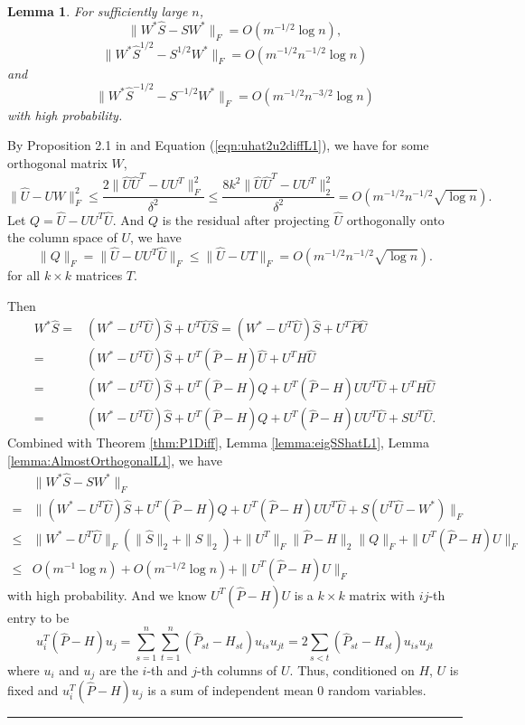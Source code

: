 \documentclass[a4paper]{article}
\newenvironment{proof}{{\bf Proof:  }}{\hfill\rule{2mm}{2mm}}
\newtheorem{lemma}[fact]{Lemma}
\begin{document}
\begin{lemma}
\label{lemma:exchangeL1}
For sufficiently large $n$,
\[
	\| W^* \hat{S} - S W^* \|_F = O(m^{-1/2} \log n),
\]
\[
	\|W^* \hat{S}^{1/2} - S^{1/2} W^* \|_F = O(m^{-1/2} n^{-1/2} \log n)
\]
and
\[
	\| W^* \hat{S}^{-1/2} - S^{-1/2} W^* \|_F = O(m^{-1/2} n^{-3/2} \log n)
\]
with high probability.
\end{lemma}
\begin{proof}
By Proposition 2.1 in \cite{rohe2011spectral} and Equation (\ref{eqn:uhat2u2diffL1}), we have for some orthogonal matrix $W$,
\[
\|\hat{U} - U W\|_F^2 \le \frac{2 \|\hat{U} \hat{U}^T - U U^T\|_F^2}{\delta^2}
\le \frac{8 k^2 \|\hat{U} \hat{U}^T - U U^T\|_2^2}{\delta^2} = O(m^{-1/2} n^{-1/2} \sqrt{\log n}).
\]
Let $Q = \hat{U} - U U^T \hat{U}$. And $Q$ is the residual after projecting $\hat{U}$ orthogonally onto the column space of $U$, we have
\begin{equation}
\label{eqn:QFnormL1}
\| Q \|_F = \| \hat{U} - U U^T \hat{U} \|_F \le \| \hat{U} - U T \|_F = O(m^{-1/2} n^{-1/2} \sqrt{\log n}).
\end{equation}
for all $k \times k$ matrices $T$. 

Then
\begin{align*}
	W^* \hat{S} = & (W^* - U^T \hat{U}) \hat{S} + U^T \hat{U} \hat{S}
    = (W^* - U^T \hat{U}) \hat{S} + U^T \hat{P} \hat{U} \\
    = & (W^* - U^T \hat{U}) \hat{S} + U^T (\hat{P} - H) \hat{U} + U^T H \hat{U} \\
    = & (W^* - U^T \hat{U}) \hat{S} + U^T (\hat{P} - H) Q + U^T (\hat{P} - H) U U^T \hat{U} + U^T H \hat{U} \\
    = & (W^* - U^T \hat{U}) \hat{S} + U^T (\hat{P} - H) Q + U^T (\hat{P} - H) U U^T \hat{U} + S U^T \hat{U}.
\end{align*}
Combined with Theorem \ref{thm:P1Diff}, Lemma \ref{lemma:eigSShatL1}, Lemma \ref{lemma:AlmostOrthogonalL1}, we have
\begin{align*}
	& \| W^* \hat{S} - S W^* \|_F \\
    = & \| (W^* - U^T \hat{U}) \hat{S} + U^T (\hat{P} - H) Q + U^T (\hat{P} - H) U U^T \hat{U} + S (U^T \hat{U} - W^*)\|_F \\
    \le & \| W^* - U^T \hat{U} \|_F (\| \hat{S} \|_2 + \| S \|_2) + \| U^T \|_F \| \hat{P} - H\|_2 \| Q \|_F + \| U^T (\hat{P} - H) U \|_F \\
    \le & O(m^{-1} \log n) + O(m^{-1/2} \log n) + \| U^T (\hat{P} - H) U \|_F
\end{align*}
with high probability. And we know $U^T (\hat{P} - H) U$ is a $k \times k$ matrix with $ij$-th entry to be
\[
	u_i^T (\hat{P} - H) u_j
    = \sum_{s=1}^n \sum_{t=1}^n (\hat{P}_{st} - H_{st}) u_{is} u_{jt}
    = 2 \sum_{s<t} (\hat{P}_{st} - H_{st}) u_{is} u_{jt}
\]
where $u_i$ and $u_j$ are the $i$-th and $j$-th columns of $U$. Thus, conditioned on $H$, $U$ is fixed and $u_i^T (\hat{P} - H) u_j$ is a sum of independent mean 0 random variables.



\end{proof}
\end{document}
